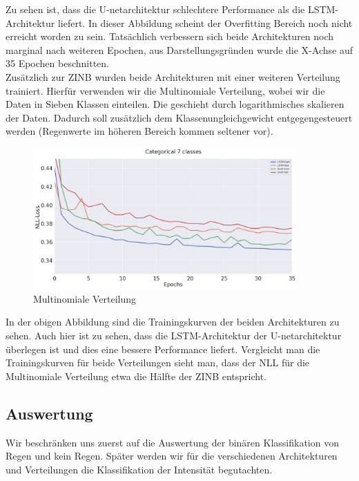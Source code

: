 \noindent Zu sehen ist, dass die U-netarchitektur schlechtere Performance als die LSTM-Architektur liefert. In dieser Abbildung scheint der Overfitting Bereich noch nicht erreicht worden zu sein.
Tatsächlich verbessern sich beide Architekturen noch marginal nach weiteren Epochen, aus Darstellungsgründen wurde die X-Achse auf 35 Epochen beschnitten.\\

\noindent Zusätzlich zur ZINB wurden beide Architekturen mit einer weiteren Verteilung trainiert. Hierfür verwenden wir die Multinomiale Verteilung, wobei wir die Daten in Sieben Klassen einteilen. Die geschieht durch logarithmisches skalieren der Daten. Dadurch soll zusätzlich dem Klassenungleichgewicht entgegengesteuert werden (Regenwerte im höheren Bereich kommen seltener vor). 

\begin{figure}[htb]
 \centering
 \includegraphics[width=0.9\textwidth,angle=0]{abb/loss_multinom.png}
 \caption{Multinomiale Verteilung}
\label{fig:multinomialeVerteilung}
\end{figure}

\noindent In der obigen Abbildung sind die Trainingskurven der beiden Architekturen zu sehen. Auch hier ist zu sehen, dass die LSTM-Architektur der U-netarchitektur überlegen ist und dies eine bessere Performance liefert. Vergleicht man die Trainingskurven für beide Verteilungen sieht man, dass der NLL für die Multinomiale Verteilung etwa die Hälfte der ZINB entspricht.

\subsection{Auswertung}

Wir beschränken uns zuerst auf die Auswertung der binären Klassifikation von Regen und kein Regen. Später werden wir für die verschiedenen Architekturen und Verteilungen die Klassifikation der Intensität begutachten.

